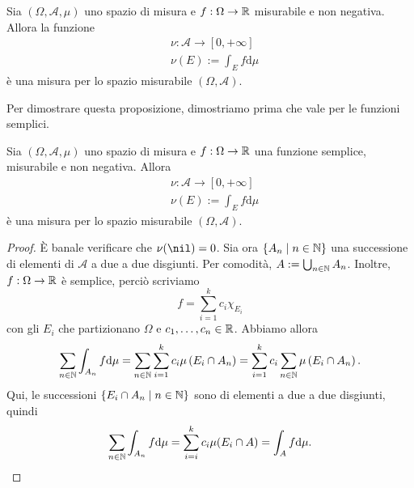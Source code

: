 \begin{proposizione}\label{proposizione:MisuraIntegrale}
Sia \((\Omega, \mathcal A, \mu)\) uno spazio di misura e \(f : \Omega \to \mathbb R\) misurabile e non negativa. Allora la funzione
\begin{align*}
& \nu : \mathcal A \to [0, +\infty] \\
& \nu(E) := \int_E f \mathrm d \mu
\end{align*}
è una misura per lo spazio misurabile \((\Omega, \mathcal A)\).
\end{proposizione}

Per dimostrare questa proposizione, dimostriamo prima che vale per le funzioni semplici.

\begin{lemma}
Sia \((\Omega, \mathcal A, \mu)\) uno spazio di misura e \(f : \Omega \to \mathbb R\) una funzione semplice, misurabile e non negativa. Allora
\begin{align*}
& \nu : \mathcal A \to [0, +\infty] \\
& \nu(E) := \int_E f \mathrm d \mu
\end{align*}
è una misura per lo spazio misurabile \((\Omega, \mathcal A)\).
\end{lemma}

\begin{proof}
È banale verificare che \(\nu(\nil) = 0\). Sia ora \(\left\{A_n \mid n \in \mathbb N\right\}\) una successione di elementi di \(\mathcal A\) a due a due disgiunti. Per comodità, \(A := \bigcup_{n \in \mathbb N} A_n\). Inoltre, \(f : \Omega \to \mathbb R\) è semplice, perciò scriviamo
\[f = \sum_{i=1}^k c_i \chi_{E_i}\]
con gli \(E_i\) che partizionano \(\Omega\) e \(c_1, \dots{}, c_n \in \mathbb R\). Abbiamo allora
\[\sum_{n \in \mathbb N} \int_{A_n} f \mathrm d \mu = \sum_{n \in \mathbb N} \sum_{i = 1}^k c_i \mu \left(E_i \cap A_n \right) = \sum_{i = 1}^k c_i  \sum_{n \in \mathbb N} \mu \left(E_i \cap A_n \right) .\]
Qui, le successioni \(\left\{E_i \cap A_n \mid n \in \mathbb N\right\}\) sono di elementi a due a due disgiunti, quindi
\[\sum_{n \in \mathbb N} \int_{A_n} f \mathrm d \mu = \sum_{i = i}^k c_i \mu(E_i \cap A) = \int_{A} f \mathrm d \mu . \qedhere\]
\end{proof}

